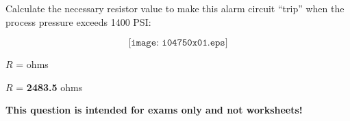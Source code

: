 

Calculate the necessary resistor value to make this alarm circuit ``trip'' when the process pressure exceeds 1400 PSI:

$$\texttt{[image: i04750x01.eps]}$$

$R$ = \underbar{\hskip 50pt} ohms







$R$ = {\bf 2483.5} ohms







{\bf This question is intended for exams only and not worksheets!}



